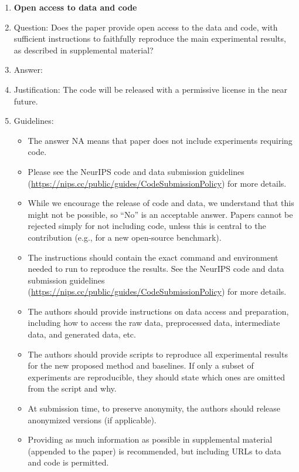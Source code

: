 \documentclass{article}
\begin{document}
{\begin{enumerate}
\item {\bf Open access to data and code}
    \item[] Question: Does the paper provide open access to the data and code, with sufficient instructions to faithfully reproduce the main experimental results, as described in supplemental material?
    \item[] Answer: \answerNo{} %
    \item[] Justification: The code will be released with a permissive license in the near future.
    \item[] Guidelines:
    \begin{itemize}
        \item The answer NA means that paper does not include experiments requiring code.
        \item Please see the NeurIPS code and data submission guidelines (\url{https://nips.cc/public/guides/CodeSubmissionPolicy}) for more details.
        \item While we encourage the release of code and data, we understand that this might not be possible, so “No” is an acceptable answer. Papers cannot be rejected simply for not including code, unless this is central to the contribution (e.g., for a new open-source benchmark).
        \item The instructions should contain the exact command and environment needed to run to reproduce the results. See the NeurIPS code and data submission guidelines (\url{https://nips.cc/public/guides/CodeSubmissionPolicy}) for more details.
        \item The authors should provide instructions on data access and preparation, including how to access the raw data, preprocessed data, intermediate data, and generated data, etc.
        \item The authors should provide scripts to reproduce all experimental results for the new proposed method and baselines. If only a subset of experiments are reproducible, they should state which ones are omitted from the script and why.
        \item At submission time, to preserve anonymity, the authors should release anonymized versions (if applicable).
        \item Providing as much information as possible in supplemental material (appended to the paper) is recommended, but including URLs to data and code is permitted.
    \end{itemize}



\end{enumerate}}
\end{document}
